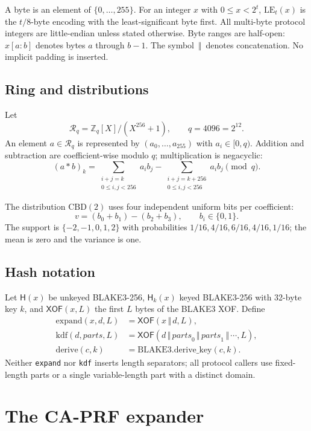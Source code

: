 \documentclass[runningheads]{llncs}
\newcommand{\concat}{\,\Vert\,}
\newcommand{\bits}{\{0,1\}}
\newcommand{\Z}{\mathbb{Z}}
\newcommand{\Ring}{\mathcal{R}_q}
\newcommand{\Hash}{\mathsf{H}}
\newcommand{\XOF}{\mathsf{XOF}}
\newcommand{\CBD}{\mathrm{CBD}}
\begin{document}
A byte is an element of $\{0,\ldots,255\}$.  For an integer $x$ with
$0\le x<2^t$, $\mathrm{LE}_t(x)$ is the $t/8$-byte encoding with the
least-significant byte first.  All multi-byte protocol integers are
little-endian unless stated otherwise.  Byte ranges are half-open:
$x[a:b]$ denotes bytes $a$ through $b-1$.  The symbol $\concat$ denotes
concatenation.  No implicit padding is inserted.

\subsection{Ring and distributions}

Let
\[
 \Ring=\Z_q[X]/(X^{256}+1),\qquad q=4096=2^{12}.
\]
An element $a\in\Ring$ is represented by $(a_0,\ldots,a_{255})$ with
$a_i\in[0,q)$.  Addition and subtraction are coefficient-wise modulo
$q$; multiplication is negacyclic:
\[
 (a*b)_k=\sum_{\substack{i+j=k\\0\le i,j<256}}a_i b_j
 -\sum_{\substack{i+j=k+256\\0\le i,j<256}}a_i b_j\pmod q.
\]

The distribution $\CBD(2)$ uses four independent uniform bits per
coefficient:
\[
 v=(b_0+b_1)-(b_2+b_3),\qquad b_i\in\bits.
\]
The support is $\{-2,-1,0,1,2\}$ with probabilities
$1/16,4/16,6/16,4/16,1/16$; the mean is zero and the variance is one.

\subsection{Hash notation}

Let $\Hash(x)$ be unkeyed BLAKE3-256, $\Hash_k(x)$ keyed BLAKE3-256 with
32-byte key $k$, and $\XOF(x,L)$ the first $L$ bytes of the BLAKE3 XOF.
Define
\[
\begin{aligned}
 \mathrm{expand}(x,d,L)&=\XOF(x\concat d,L),\\
 \mathrm{kdf}(d,\mathit{parts},L)&=
 \XOF(d\concat\mathit{parts}_0\concat\mathit{parts}_1\concat\cdots,L),\\
 \mathrm{derive}(c,k)&=\mathrm{BLAKE3.derive\_key}(c,k).
\end{aligned}
\]
Neither \texttt{expand} nor \texttt{kdf} inserts length separators; all
protocol callers use fixed-length parts or a single variable-length
part with a distinct domain.

\section{The CA-PRF expander}
\label{sec:caprf}
\end{document}
